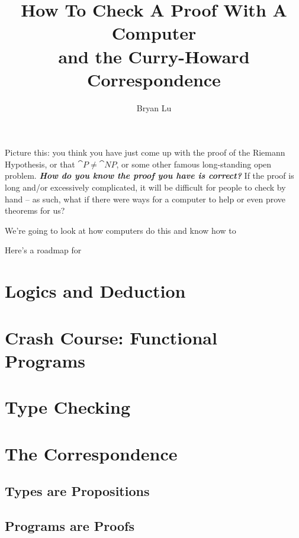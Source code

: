 \documentclass[12pt, nodate]{scrartcl}
\title{How To Check A Proof With A Computer \\ and the Curry-Howard Correspondence}
\author{Bryan Lu}
\begin{document}
\maketitle

Picture this: you think you have just come up with the proof of the Riemann Hypothesis, or that $\cat P \neq \cat{NP}$, or some other famous long-standing open problem. \textbf{\textit{How do you know the proof you have is correct?}} If the proof is long and/or excessively complicated, it will be difficult for people to check by hand -- as such, what if there were ways for a computer to help or even prove theorems for us?

We're going to look at how computers do this and know how to

Here's a roadmap for

\section{Logics and Deduction}

\section{Crash Course: Functional Programs}

\section{Type Checking}

\section{The Correspondence}
\subsection{Types are Propositions}

\subsection{Programs are Proofs}
\end{document}
